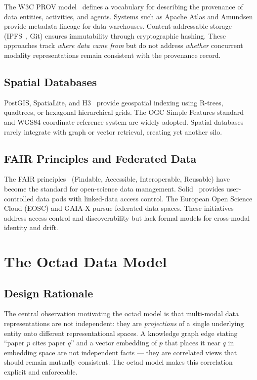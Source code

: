 \documentclass[11pt,twocolumn]{article}
\begin{document}
The W3C PROV model~\cite{w3cprov2013} defines a vocabulary for describing the
provenance of data entities, activities, and agents.  Systems such as
Apache Atlas and Amundsen provide metadata lineage for data warehouses.
Content-addressable storage (IPFS~\cite{benet2014ipfs}, Git) ensures
immutability through cryptographic hashing.  These approaches track
\emph{where data came from} but do not address \emph{whether} concurrent
modality representations remain consistent with the provenance record.

\subsection{Spatial Databases}

PostGIS, SpatiaLite, and H3~\cite{uber2018h3} provide geospatial indexing
using R-trees, quadtrees, or hexagonal hierarchical grids.  The OGC Simple
Features standard and WGS84 coordinate reference system are widely adopted.
Spatial databases rarely integrate with graph or vector retrieval, creating
yet another silo.

\subsection{FAIR Principles and Federated Data}

The FAIR principles~\cite{wilkinson2016fair} (Findable, Accessible,
Interoperable, Reusable) have become the standard for open-science data
management.  Solid~\cite{sambra2016solid} provides user-controlled data pods
with linked-data access control.  The European Open Science Cloud (EOSC)
and GAIA-X pursue federated data spaces.  These initiatives address access
control and discoverability but lack formal models for cross-modal identity
and drift.

\section{The Octad Data Model}\label{sec:octad}

\subsection{Design Rationale}

The central observation motivating the octad model is that multi-modal data
representations are not independent: they are \emph{projections} of a single
underlying entity onto different representational spaces.  A knowledge graph
edge stating ``paper $p$ cites paper $q$'' and a vector embedding of $p$ that
places it near $q$ in embedding space are not independent facts --- they are
correlated views that should remain mutually consistent.  The octad model
makes this correlation explicit and enforceable.
\end{document}
